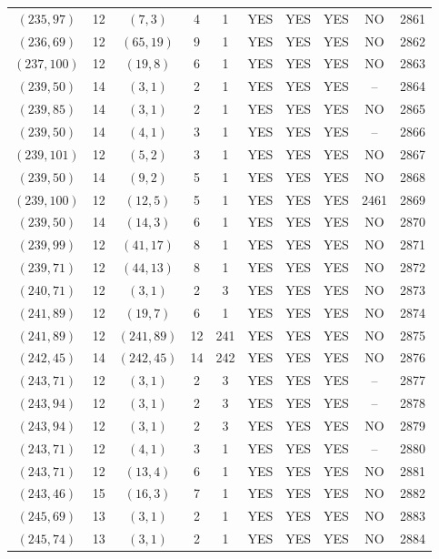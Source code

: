 \begin{longtable}{|c|c|c|c|c|c|c|c|c|c|}
$(235, 97)$ & 12 & $(7, 3)$ & 4 & 1 & YES & YES & YES & NO & 2861\\
$(236, 69)$ & 12 & $(65, 19)$ & 9 & 1 & YES & YES & YES & NO & 2862\\
$(237, 100)$ & 12 & $(19, 8)$ & 6 & 1 & YES & YES & YES & NO & 2863\\
$(239, 50)$ & 14 & $(3, 1)$ & 2 & 1 & YES & YES & YES & -- & 2864\\
$(239, 85)$ & 14 & $(3, 1)$ & 2 & 1 & YES & YES & YES & NO & 2865\\
$(239, 50)$ & 14 & $(4, 1)$ & 3 & 1 & YES & YES & YES & -- & 2866\\
$(239, 101)$ & 12 & $(5, 2)$ & 3 & 1 & YES & YES & YES & NO & 2867\\
$(239, 50)$ & 14 & $(9, 2)$ & 5 & 1 & YES & YES & YES & NO & 2868\\
$(239, 100)$ & 12 & $(12, 5)$ & 5 & 1 & YES & YES & YES & 2461 & 2869\\
$(239, 50)$ & 14 & $(14, 3)$ & 6 & 1 & YES & YES & YES & NO & 2870\\
$(239, 99)$ & 12 & $(41, 17)$ & 8 & 1 & YES & YES & YES & NO & 2871\\
$(239, 71)$ & 12 & $(44, 13)$ & 8 & 1 & YES & YES & YES & NO & 2872\\
$(240, 71)$ & 12 & $(3, 1)$ & 2 & 3 & YES & YES & YES & NO & 2873\\
$(241, 89)$ & 12 & $(19, 7)$ & 6 & 1 & YES & YES & YES & NO & 2874\\
$(241, 89)$ & 12 & $(241, 89)$ & 12 & 241 & YES & YES & YES & NO & 2875\\
$(242, 45)$ & 14 & $(242, 45)$ & 14 & 242 & YES & YES & YES & NO & 2876\\
$(243, 71)$ & 12 & $(3, 1)$ & 2 & 3 & YES & YES & YES & -- & 2877\\
$(243, 94)$ & 12 & $(3, 1)$ & 2 & 3 & YES & YES & YES & -- & 2878\\
$(243, 94)$ & 12 & $(3, 1)$ & 2 & 3 & YES & YES & YES & NO & 2879\\
$(243, 71)$ & 12 & $(4, 1)$ & 3 & 1 & YES & YES & YES & -- & 2880\\
$(243, 71)$ & 12 & $(13, 4)$ & 6 & 1 & YES & YES & YES & NO & 2881\\
$(243, 46)$ & 15 & $(16, 3)$ & 7 & 1 & YES & YES & YES & NO & 2882\\
$(245, 69)$ & 13 & $(3, 1)$ & 2 & 1 & YES & YES & YES & NO & 2883\\
$(245, 74)$ & 13 & $(3, 1)$ & 2 & 1 & YES & YES & YES & NO & 2884\\

\end{longtable}
